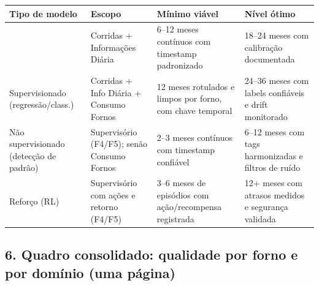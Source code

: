 \begin{small}
\setlength{\tabcolsep}{2pt}
\renewcommand{\arraystretch}{1.20}
\begin{tabularx}{\linewidth}{>{\RaggedRight\arraybackslash}p{3.2cm} >{\RaggedRight\arraybackslash}p{4.3cm} >{\RaggedRight\arraybackslash}p{4.3cm} >{\RaggedRight\arraybackslash}p{4.3cm}}
\toprule
Tipo de modelo & Escopo & Mínimo viável & Nível ótimo \\
\midrule
\makecell[l]{Physic-based (balanços)\\} & \makecell[l]{Corridas + Informações Diária\\} & \makecell[l]{6–12 meses contínuos com timestamp padronizado\\} & \makecell[l]{18–24 meses com calibração documentada\\} \\
\hline
\makecell[l]{Supervisionado (regressão/class.)\\} & \makecell[l]{Corridas + Info Diária + Consumo Fornos\\} & \makecell[l]{12 meses rotulados e limpos por forno, com chave temporal\\} & \makecell[l]{24–36 meses com labels confiáveis e drift monitorado\\} \\
\hline
\makecell[l]{Não supervisionado (detecção de padrão)\\} & \makecell[l]{Supervisório (F4/F5); senão Consumo Fornos\\} & \makecell[l]{2–3 meses contínuos com timestamp confiável\\} & \makecell[l]{6–12 meses com tags harmonizadas e filtros de ruído\\} \\
\hline
\makecell[l]{Reforço (RL)\\} & \makecell[l]{Supervisório com ações e retorno (F4/F5)\\} & \makecell[l]{3–6 meses de episódios com ação/recompensa registrada\\} & \makecell[l]{12+ meses com atrasos medidos e segurança validada\\} \\
\bottomrule
\end{tabularx}
\end{small}

\clearpage

\subsection{\texorpdfstring{\textbf{6. Quadro consolidado: qualidade por
forno e por domínio (uma
página)}}{6. Quadro consolidado: qualidade por forno e por domínio (uma página)}}\label{quadro-consolidado-qualidade-por-forno-e-por-domuxednio-uma-puxe1gina}

